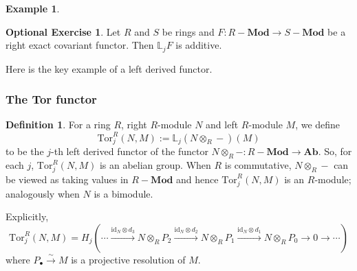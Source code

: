\documentclass{amsart}[12pt]
\newcommand{\Tor}{\mathrm{Tor}}
\def\ker{\operatorname{ker}}
\newcommand{\id}{\mathrm{id}}
\newcommand{\bL}{{\mathbb{L}}}
\newcommand{\Z}{\mathbb{Z}}
\numberwithin{equation}{section}
\theoremstyle{plain} %
\theoremstyle{definition}
\newtheorem{defn}[equation]{Definition}
\newtheorem{ex}[equation]{Example}
\newtheorem{exer}[equation]{Optional Exercise}
\theoremstyle{remark}
\newcommand{\sssec}[1]{\subsubsection{#1}}
\newcommand{\xra}[1]{\xrightarrow{#1}}
\newcommand{\Ab}{\mathbf{Ab}}
\newcommand{\Mod}[1]{#1-\mathbf{Mod}}
\begin{document}
\begin{ex}
\begin{exer} 
Let $R$ and $S$ be rings and $F: \Mod{R} \to \Mod{S}$ be a right exact covariant functor. Then $\bL_j F$ is additive.
\end{exer}

Here is the key example of a left derived functor.

\sssec{The Tor functor}

\begin{defn}
For a ring $R$, right $R$-module $N$ and left $R$-module
  $M$, we define
$$
\Tor^R_j(N, M) := \bL_j (N \otimes_R -)(M)
$$
to be the $j$-th left derived functor of the functor $N \otimes_R -: \Mod{R} \to
\Ab$. So, for each $j$, $\Tor^R_j(N, M)$ is an abelian group. When $R$ is commutative, $N \otimes_R -$ can be viewed as taking values in $\Mod{R}$ and hence $\Tor^R_j(N, M)$ is an $R$-module; analogously when $N$ is a bimodule.
\end{defn}



Explicitly, 
$$
\Tor^R_j(N, M) = H_j( \cdots \xra{\id_N \otimes d_3} N \otimes_R P_2 \xra{\id_N \otimes d_2} N \otimes_R P_1
\xra{\id_N \otimes d_1} N \otimes_R P_0 \to 0 \to \cdots)
$$
where $P_\bullet \xra{\sim} M$ is a projective resolution of $M$. 


\begin{comment}
\begin{ex} 
Let's compute $\Tor^\Z_j(N, \Z/n\Z)$ for any $\Z$-module $N$ and integers $n \geq 1$, and $j$. 

We have the projective resolution $\cdots \to 0 \to \Z \xra{n} \Z (\to \Z/n\Z) \to 0$ of $\Z/n\Z$ and so $\Tor^R_j(N,\Z/n\Z)$ is the homology of the complex
$$
\cdots 0 \to N \otimes_\Z \Z \xra{\id_N \otimes n} N \otimes_\Z \Z \to 0
$$
 (where the two nonzero terms lie in degrees $0$ and $1$).  This complex is isomorphic to the complex
$$
\cdots 0 \to N \xra{n} N  \to 0
$$
and hence
$$
\Tor_0^R(N, \Z/n\Z) \cong N/nN \cong N \otimes_\Z \Z/n\Z
$$
(as the Proposition below tells us), 
$$
\Tor_1^R(N, \Z/n\Z) \cong \ker(N \xra{n} N) = \{x \in N \mid n \cdot x = 0\},
$$
and
$$
\Tor_j^R(N, \Z/n\Z) = \bL_j F(\Z/n\Z) = 0
$$
for all $j \notin \{0,1\}$.

Note that $\Tor_1^R(N, \Z/n\Z)$ is the $n$-torsion submodule of $N$ --- this explains the notation $\Tor$.
\end{ex}




\end{comment}
\end{ex}
\end{document}

